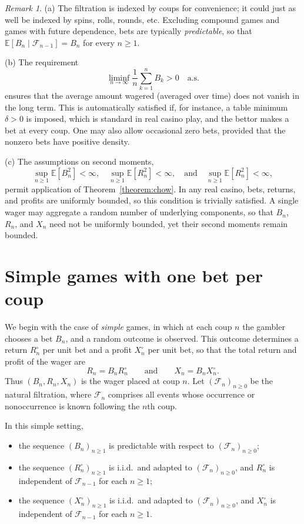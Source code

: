 \documentclass{article}
\theoremstyle{definition}
\theoremstyle{remark}
\newtheorem{remark}[theorem]{Remark}
\newcommand{\E}{\mathbb{E}}
\newcommand{\F}{\mathscr{F}}
\begin{document}
\begin{remark}
(a) The filtration is indexed by coups for convenience; it could just as well be indexed by spins, rolls, rounds, etc.  
Excluding compound games and games with future dependence, bets are typically \textit{predictable}, so that $\E[B_n \mid \F_{n-1}] = B_n$ for every $n\ge1$. 

(b) The requirement
    \[
        \liminf_{n\to\infty} \frac{1}{n}\sum_{k=1}^n B_k > 0\quad\text{a.s.}
    \]
    ensures that the average amount wagered (averaged over time) does not vanish in the long term.  
    This is automatically satisfied if, for instance, a table minimum $\delta>0$ is imposed, which is standard in real casino play, and the bettor makes a bet at every coup.  One may also allow occasional zero bets, provided that the nonzero bets have positive density. 

(c) The assumptions on second moments,
    \[
\sup_{n \ge 1} \E[B_n^2] < \infty, \quad \sup_{n \ge 1} \E[R_n^2] < \infty,\quad\text{and}\quad\sup_{n \ge 1} \E[R_n^2] < \infty,
    \]
permit application of Theorem~\ref{theorem:chow}.
    In any real casino, bets, returns, and profits are uniformly bounded, so this condition is trivially satisfied.  
    A single wager may aggregate a random number of underlying components, so that $B_n$, $R_n$, and $X_n$ need not be uniformly bounded, yet their second moments remain bounded.
\end{remark}




\section{Simple games with one bet per coup}\label{sec:simple-one}

We begin with the case of \textit{simple} games, in which at each coup $n$ the gambler chooses a bet $B_n$, and a random outcome is observed.  
This outcome determines a return $R_n^{\circ}$ per unit bet and a profit $X_n^{\circ}$ per unit bet, so that the total return and profit of the wager are
\begin{equation*}
    R_n = B_n R_n^{\circ}
    \qquad\text{and}\qquad
    X_n = B_n X_n^{\circ}.
\end{equation*}
Thus $(B_n, R_n, X_n)$ is the wager placed at coup $n$.  
Let $(\F_n)_{n\ge 0}$ be the natural filtration, where $\F_n$ comprises all events whose occurrence or nonoccurrence is known following the $n$th coup.

In this simple setting,
\begin{itemize}
    \item the sequence $(B_n)_{n\ge1}$ is predictable with respect to $(\F_n)_{n\ge0}$;
    \item the sequence $(R_n^\circ)_{n\ge1}$ is i.i.d.\ and adapted to $(\F_n)_{n\ge0}$, and $R_n^\circ$ is independent of $\F_{n-1}$ for each $n\ge1$;
    \item the sequence $(X_n^\circ)_{n\ge1}$ is i.i.d.\ and adapted to $(\F_n)_{n\ge0}$, and $X_n^\circ$ is independent of $\F_{n-1}$ for each $n\ge1$.
\end{itemize}
\end{document}
